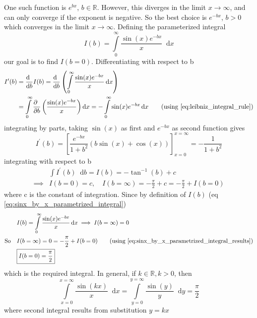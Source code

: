 \documentclass[11pt, a4paper]{article}
\newcommand{\eqrefnp}[1]{\textup{\ref{#1}}}
\newcommand{\primed}[1]{#1^{\prime}}
\newcommand{\diff}{\mathop{}\!\mathrm{d}}
\newcommand{\dx}{\diff x}
\newcommand{\dy}{\diff y}
\newcommand{\derv}[1]{\frac{\diff \hfill}{\diff #1}}	%
\newcommand{\dervb}[2]{\derv{#1} \left(#2\right)}  %
\newcommand{\pdiff}{\mathop{}\!\mathrm{\partial}} %
\newcommand{\pderv}[1]{\frac{\pdiff \hfill}{\pdiff #1}}	%
\newcommand{\pdervb}[2]{\pderv{#1} \left(#2\right)}  %
\newcommand{\dint}[2]{\int \limits_{#1}^{#2}}  %
\newcommand{\intzerotoinfty}{\dint{0}{\infty}}	%
\begin{document}
One such function is $e^{bx}$, $b \in \mathbb{R}$. However, this diverges in the limit $x \to \infty$, and can only converge if the exponent is negative. So the best choice is $e^{-bx}$, $b > 0$ which converges in the limit $x \to \infty$. Defining the parameterized integral
\begin{equation}\label{eq:sinx_by_x_parametrized_integral}
	I(b) = \intzerotoinfty \frac{\sin(x) e^{-bx}}{x} \dx
\end{equation}
our goal is to find $I(b=0)$. Differentiating with respect to b
\begin{align*}
	\primed{I}(b) & = \derv{b}I(b) = \dervb{b}{\intzerotoinfty \frac{\sin(x) e^{-bx}}{x} \dx} \\
	& = \intzerotoinfty \pdervb{b}{\frac{\sin(x) e^{-bx}}{x}} \dx = -\intzerotoinfty \sin(x) e^{-bx} \dx \tag{using \eqrefnp{eq:leibniz_integral_rule}}
\end{align*}
integrating by parts, taking $\sin(x)$ as first and $e^{-bx}$ as second function gives
\begin{equation*}
	\primed{I}(b) = \left[\frac{e^{-bx}}{1 + b^{2}} \left(b\sin(x) + \cos(x)\right)\right]_{x=0}^{x=\infty} = -\frac{1}{1 + b^{2}}
\end{equation*}
integrating with respect to b
\begin{align}
	& \int \primed{I}(b) \diff b = I(b) = -\tan^{-1}(b) + c \nonumber \\
	\implies & I(b=0) = c, \quad I(b=\infty) = -\frac{\pi}{2} + c = -\frac{\pi}{2} + I(b=0) \label{eq:sinx_by_x_parametrized_integral_results}
\end{align}
where c is the constant of integration. Since by definition of $I(b)$ (eq \eqrefnp{eq:sinx_by_x_parametrized_integral})
\begin{align*}
	& I(b) = \intzerotoinfty \frac{\sin(x) e^{-bx}}{x} \dx \implies I(b=\infty) = 0 \\
	\text{So} \quad & I(b=\infty) = 0 = -\frac{\pi}{2} + I(b=0) \tag{using \eqrefnp{eq:sinx_by_x_parametrized_integral_results}} \\
	& \boxed{I(b=0) = \frac{\pi}{2}}
\end{align*}
which is the required integral. In general, if $k \in \mathbb{R}, k > 0$, then
\begin{equation}\label{eq:int_sinkx_by_x}
\int \limits_{x=0}^{x=\infty} \frac{\sin(kx)}{x} \dx = \int \limits_{y=0}^{y=\infty} \frac{\sin(y)}{y} \dy = \frac{\pi}{2}
\end{equation}
where second integral results from substitution $y=kx$
\end{document}
